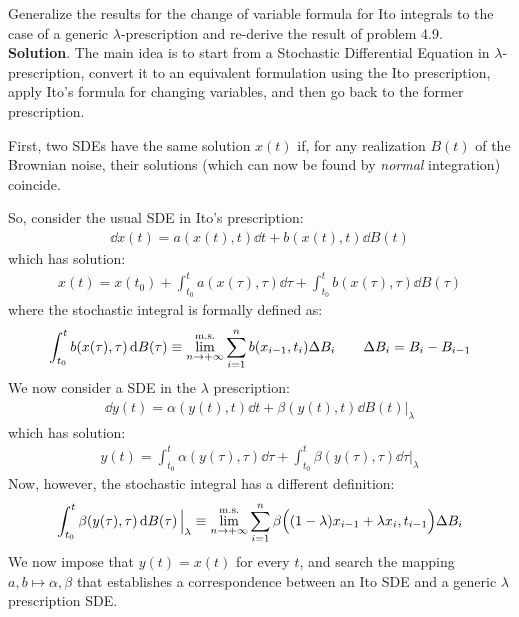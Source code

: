 \documentclass[../template.tex]{subfiles}
\begin{document}
\begin{exo}
Generalize the results for the change of variable formula for Ito integrals to the case of a generic $\lambda$-prescription and re-derive the result of problem 4.9.\\

\textbf{Solution}. The main idea is to start from a Stochastic Differential Equation in $\lambda$-prescription, convert it to an equivalent formulation using the Ito prescription, apply Ito's formula for changing variables, and then go back to the former prescription.

First, two SDEs have the same solution $x(t)$ if, for any realization $B(t)$ of the Brownian noise, their solutions (which can now be found by \textit{normal} integration) coincide.

So, consider the usual SDE in Ito's prescription:
\begin{align*}
    \dd{x(t)} = a(x(t),t) \dd{t} + b(x(t),t) \dd{B(t)}
\end{align*}
which has solution:
\begin{align*}
    x(t) = x(t_0) + \int_{t_0}^t a(x(\tau),\tau) \dd{\tau} + \int_{t_0}^t b(x(\tau), \tau) \dd{B(\tau)}
\end{align*}
where the stochastic integral is formally defined as:
\begin{align*}
    \int_{t_0}^t b(x(\tau),\tau) \dd{B(\tau)} \equiv \overset{\rm m.s.}{\lim_{n \to +\infty}} \sum_{i=1}^n b(x_{i-1}, t_i) \Delta B_i \qquad \Delta B_i = B_i - B_{i-1}
\end{align*}
We now consider a  SDE in the $\lambda$ prescription:
\begin{align*}
    \dd{y(t)} = \alpha(y(t),t) \dd{t} + \beta(y(t),t) \dd{B(t)} \big|_{\lambda}
\end{align*}
which has solution:
\begin{align*}
    y(t) = \int_{t_0}^t \alpha(y(\tau), \tau) \dd{\tau} + \int_{t_0}^t \beta(y(\tau), \tau) \dd{\tau} \Big|_{\lambda}
\end{align*}
Now, however, the stochastic integral has a different definition:
\begin{align*}
    \int_{t_0}^t \beta(y(\tau), \tau) \dd{B(\tau)} \Big|_{\lambda} \equiv \overset{\rm m.s.}{\lim_{n \to +\infty}} \sum_{i=1}^n \beta\Big( (1-\lambda) x_{i-1} + \lambda x_i, t_{i-1}\Big) \Delta B_i
\end{align*}
We now impose that $y(t) = x(t)$ for every $t$, and search the mapping $a,b \mapsto \alpha, \beta$ that establishes a correspondence between an Ito SDE and a generic $\lambda$ prescription SDE.\\


\end{exo}
\end{document}
